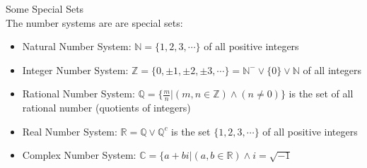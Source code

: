 \begin{definition}
Some Special Sets \\

The number systems are are special sets: \\

\begin{tcolorbox}
\begin{itemize}
    \item Natural Number System: $\mathbb{N} = \{ 1, 2, 3, \cdots \}$ of all positive integers 
	
	\item Integer Number System: $\mathbb{Z} = \{0, \pm 1, \pm 2, \pm 3, \cdots \} = {\mathbb{N}}^- \vee \{0\} \vee \mathbb{N}$ of all integers
	
	\item Rational Number System: $\mathbb{Q} = \{ \frac{m}{n} | (m,n \in \mathbb{Z}) \wedge (n \neq 0)\}$ is the set of all rational number (quotients of integers) 
	
	\item Real Number System: $\mathbb{R} = \mathbb{Q} \vee {\mathbb{Q}}^c$ is the set $\{ 1, 2, 3, \cdots \}$ of all positive integers 
	
	\item  Complex Number System: $\mathbb{C} = \{ a+bi | (a,b \in \mathbb{R})\wedge i=\sqrt{-1}$
\end{itemize}
\end{tcolorbox}

\end{definition}


